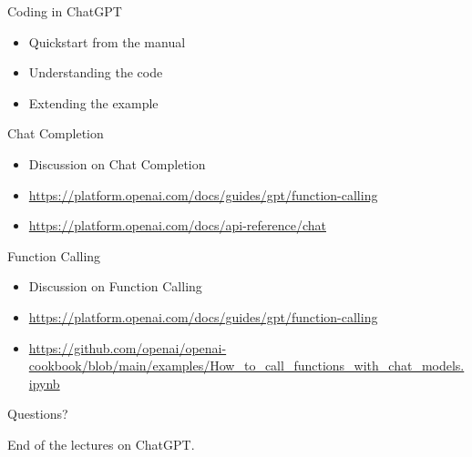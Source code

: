 \documentclass{beamer}
\begin{document}
\begin{frame}
{\centerline{Coding in ChatGPT}}
\begin{itemize}
    \item Quickstart from the manual
    \item Understanding the code
    \item Extending the example
\end{itemize} 
\end{frame}

\begin{frame}
{\centerline{Chat Completion}}
\begin{itemize}
    \item Discussion on Chat Completion
    \item \url{https://platform.openai.com/docs/guides/gpt/function-calling}
    \item \url{https://platform.openai.com/docs/api-reference/chat}
\end{itemize} 
\end{frame}

\begin{frame}
{\centerline{Function Calling}}
\begin{itemize}
    \item Discussion on Function Calling
    \item \url{https://platform.openai.com/docs/guides/gpt/function-calling}
    \item \url{https://github.com/openai/openai-cookbook/blob/main/examples/How_to_call_functions_with_chat_models.ipynb}
\end{itemize} 
\end{frame}


\begin{frame}
{\centerline{Questions?}}
\vspace{1cm}
\begin{center}
    \LARGE{End of the lectures on ChatGPT.}
\end{center}

\end{frame}
\end{document}
